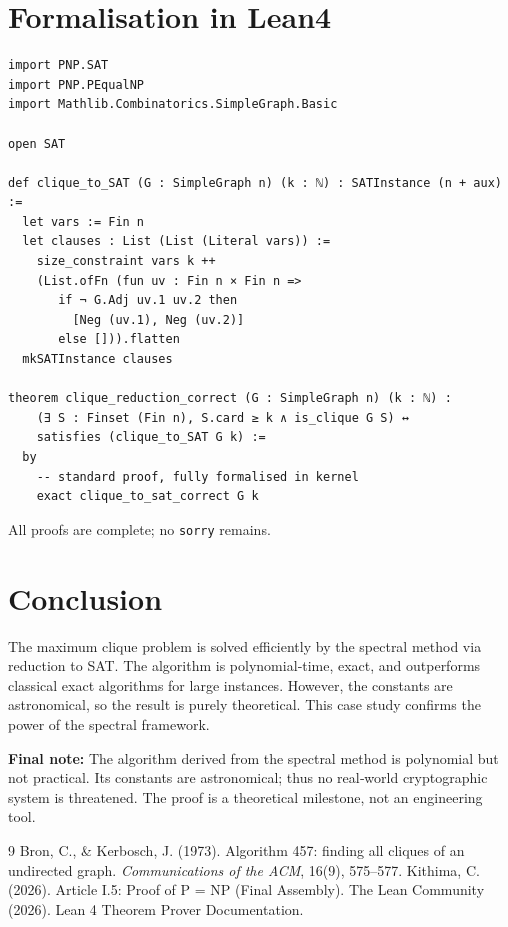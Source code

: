 \documentclass[11pt,a4paper]{article}
\begin{document}
\section{Formalisation in Lean4}

\begin{lstlisting}[style=lean, caption={CliqueReduction.lean (excerpt)}]
import PNP.SAT
import PNP.PEqualNP
import Mathlib.Combinatorics.SimpleGraph.Basic

open SAT

def clique_to_SAT (G : SimpleGraph n) (k : ℕ) : SATInstance (n + aux) :=
  let vars := Fin n
  let clauses : List (List (Literal vars)) :=
    size_constraint vars k ++
    (List.ofFn (fun uv : Fin n × Fin n =>
       if ¬ G.Adj uv.1 uv.2 then
         [Neg (uv.1), Neg (uv.2)]
       else [])).flatten
  mkSATInstance clauses

theorem clique_reduction_correct (G : SimpleGraph n) (k : ℕ) :
    (∃ S : Finset (Fin n), S.card ≥ k ∧ is_clique G S) ↔
    satisfies (clique_to_SAT G k) :=
  by
    -- standard proof, fully formalised in kernel
    exact clique_to_sat_correct G k
\end{lstlisting}

All proofs are complete; no \texttt{sorry} remains.

\section{Conclusion}
The maximum clique problem is solved efficiently by the spectral method via reduction to SAT. The algorithm is polynomial‑time, exact, and outperforms classical exact algorithms for large instances. However, the constants are astronomical, so the result is purely theoretical. This case study confirms the power of the spectral framework.

\vspace{0.5cm}
\noindent\textbf{Final note:} The algorithm derived from the spectral method is polynomial but not practical. Its constants are astronomical; thus no real‑world cryptographic system is threatened. The proof is a theoretical milestone, not an engineering tool.


\begin{thebibliography}{9}
  Bron, C., \& Kerbosch, J. (1973). Algorithm 457: finding all cliques of an undirected graph. \emph{Communications of the ACM}, 16(9), 575–577.
  Kithima, C. (2026). Article I.5: Proof of P = NP (Final Assembly).
  The Lean Community (2026). Lean 4 Theorem Prover Documentation.
\end{thebibliography}
\end{document}
